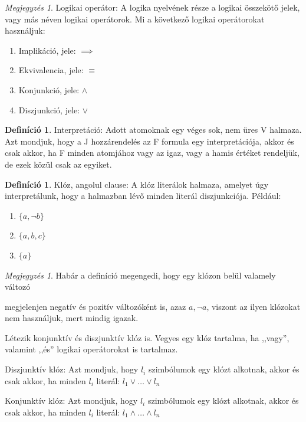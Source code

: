 \documentclass[
]{thesis-ekf}
\theoremstyle{definition}
\newtheorem{definicio}[tetel]{Definíció}
\theoremstyle{remark}
\newtheorem{megjegyzes}[tetel]{Megjegyzés}
\begin{document}
	\begin{megjegyzes}
		Logikai operátor: A logika nyelvének része a logikai összekötő jelek, vagy más néven logikai operátorok. Mi a következő logikai operátorokat használjuk:
		\begin{enumerate}
			\item Implikáció, jele: $ \implies $
			\item Ekvivalencia, jele: $ \equiv $
			\item Konjunkció, jele: $ \wedge $
			\item Diszjunkció, jele: $ \vee $
		\end{enumerate}
	\end{megjegyzes}

	\begin{definicio}
		Interpretáció: Adott atomoknak egy véges sok, nem üres V halmaza.
		Azt mondjuk, hogy a J hozzárendelés az F formula egy interpretációja, akkor és csak akkor, ha F minden atomjához vagy az igaz, vagy a hamis értéket rendeljük, de ezek közül csak az egyiket.
	\end{definicio}
	
	\begin{definicio}
		Klóz, angolul clause: A klóz literálok halmaza, amelyet úgy interpretálunk, hogy a halmazban lévő minden literál diszjunkciója. Például:
		\begin{enumerate}
			\item $ \{a,\neg b\} $
			\item $ \{a,b,c\} $
			\item $ \{a\} $
		\end{enumerate}
	\end{definicio}
	
	\begin{megjegyzes}
		Habár a definíció megengedi, hogy egy klózon belül valamely változó 

		megjelenjen negatív és pozitív változóként is, azaz $ {a,\neg a} $, viszont az ilyen klózokat nem használjuk, mert mindig igazak.
		
		Létezik konjunktív és diszjunktív klóz is. Vegyes egy klóz tartalma, ha ,,vagy'', valamint ,,és'' logikai operátorokat is tartalmaz.
	
		Diszjunktív klóz: Azt mondjuk, hogy $ l_{i} $ szimbólumok egy klózt alkotnak, akkor és csak akkor, ha minden $ l_{i} $ literál: $ l_{1}\vee\dots\vee l_{n} $
		
		Konjunktív klóz: Azt mondjuk, hogy $ l_{i} $ szimbólumok egy klózt alkotnak, akkor és csak akkor, ha minden $ l_{i} $ literál: $ l_{1}\wedge\dots\wedge l_{n} $
	\end{megjegyzes}
\end{document}
